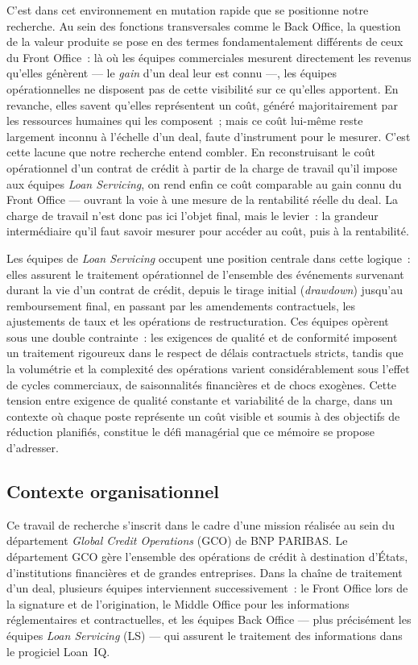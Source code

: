 C'est dans cet environnement en mutation rapide que se positionne notre recherche. Au sein des fonctions transversales comme le Back Office, la question de la valeur produite se pose en des termes fondamentalement différents de ceux du Front Office~: là où les équipes commerciales mesurent directement les revenus qu'elles génèrent --- le \textit{gain} d'un deal leur est connu ---, les équipes opérationnelles ne disposent pas de cette visibilité sur ce qu'elles apportent. En revanche, elles savent qu'elles représentent un coût, généré majoritairement par les ressources humaines qui les composent~; mais ce coût lui-même reste largement inconnu à l'échelle d'un deal, faute d'instrument pour le mesurer. C'est cette lacune que notre recherche entend combler. En reconstruisant le coût opérationnel d'un contrat de crédit à partir de la charge de travail qu'il impose aux équipes \textit{Loan Servicing}, on rend enfin ce coût comparable au gain connu du Front Office --- ouvrant la voie à une mesure de la rentabilité réelle du deal. La charge de travail n'est donc pas ici l'objet final, mais le levier~: la grandeur intermédiaire qu'il faut savoir mesurer pour accéder au coût, puis à la rentabilité.

Les équipes de \textit{Loan Servicing} occupent une position centrale dans cette logique~: elles assurent le traitement opérationnel de l'ensemble des événements survenant durant la vie d'un contrat de crédit, depuis le tirage initial (\textit{drawdown}) jusqu'au remboursement final, en passant par les amendements contractuels, les ajustements de taux et les opérations de restructuration. Ces équipes opèrent sous une double contrainte~: les exigences de qualité et de conformité imposent un traitement rigoureux dans le respect de délais contractuels stricts, tandis que la volumétrie et la complexité des opérations varient considérablement sous l'effet de cycles commerciaux, de saisonnalités financières et de chocs exogènes. Cette tension entre exigence de qualité constante et variabilité de la charge, dans un contexte où chaque poste représente un coût visible et soumis à des objectifs de réduction planifiés, constitue le défi managérial que ce mémoire se propose d'adresser.


\subsection*{Contexte organisationnel}

Ce travail de recherche s'inscrit dans le cadre d'une mission réalisée au sein du département \textit{Global Credit Operations} (GCO) de BNP PARIBAS. Le département GCO gère l'ensemble des opérations de crédit à destination d'États, d'institutions financières et de grandes entreprises. Dans la chaîne de traitement d'un deal, plusieurs équipes interviennent successivement~: le Front Office lors de la signature et de l'origination, le Middle Office pour les informations réglementaires et contractuelles, et les équipes Back Office --- plus précisément les équipes \textit{Loan Servicing} (LS) --- qui assurent le traitement des informations dans le progiciel Loan~IQ.

